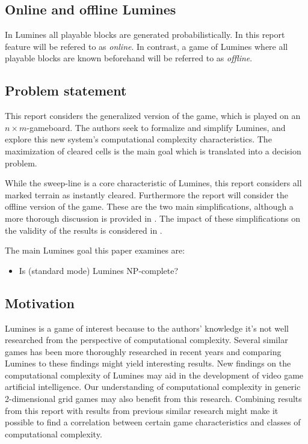 \subsection{Online and offline Lumines}
In Lumines all playable blocks are generated probabilistically. In this report feature will be refered to as \textit{online}. In contrast, a game of Lumines where all playable blocks are known beforehand will be referred to as \textit{offline}.

\subsection{Problem statement}
This report considers the generalized version of the game, which is played on an $n \times m$-gameboard. The authors seek to formalize and simplify Lumines, and explore this new system's computational complexity characteristics. The maximization of cleared cells is the main goal which is translated into a decision problem. 

While the sweep-line is a core characteristic of Lumines, this report considers all marked terrain as instantly cleared. Furthermore the report will consider the offline version of the game. These are the two main simplifications, although a more thorough discussion is provided in . The impact of these simplifications on the validity of the results is considered in .

The main Lumines goal this paper examines are:
\begin{itemize}
        \item Is (standard mode) Lumines NP-complete?
\end{itemize}

\subsection{Motivation}

Lumines is a game of interest because to the authors' knowledge it's not well researched from the perspective of computational complexity. Several similar games has been more thoroughly researched in recent years and comparing Lumines to these findings might yield interesting results. New findings on the computational complexity of Lumines may aid in the development of video game artificial intelligence. Our understanding of computational complexity in generic 2-dimensional grid games may also benefit from this research. Combining results from this report with results from previous similar research might make it possible to find a correlation between certain game characteristics and classes of computational complexity.
